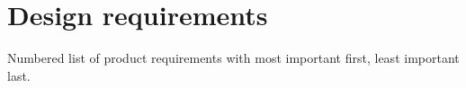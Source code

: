 \section{Design requirements}

Numbered list of product requirements with most important first, least important last.